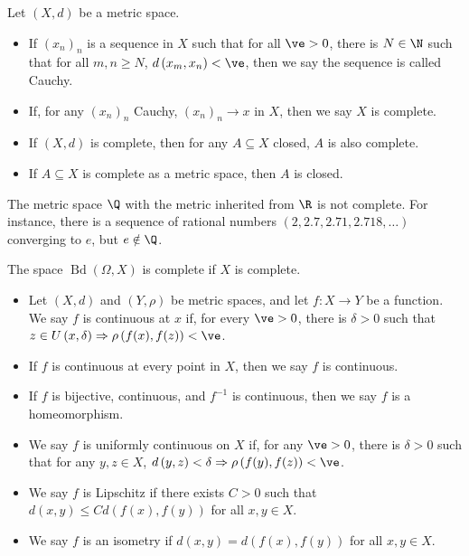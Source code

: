 \begin{definition}[Completeness]
  Let $\left(X,d\right)$ be a metric space.
  \begin{itemize}
    \item If $\left(x_n\right)_n$ is a sequence in $X$ such that for all $\ve > 0$, there is $N\in \N$ such that for all $m,n\geq N$, $d\left(x_m,x_n\right) < \ve$, then we say the sequence is called Cauchy.
    \item If, for any $\left(x_n\right)_n$ Cauchy, $\left(x_n\right)_n\rightarrow x$ in $X$, then we say $X$ is complete.
    \item If $\left(X,d\right)$ is complete, then for any $A\subseteq X$ closed, $A$ is also complete.
    \item If $A\subseteq X$ is complete as a metric space, then $A$ is closed.
  \end{itemize}
\end{definition}
\begin{example}
  The metric space $\Q$ with the metric inherited from $\R$ is not complete. For instance, there is a sequence of rational numbers $\left(2,2.7,2.71,2.718,\dots\right)$ converging to $e$, but $e\notin \Q$.\newline

  The space $\operatorname{Bd}\left(\Omega,X\right)$ is complete if $X$ is complete.
\end{example}
\begin{definition}[Continuity]\hfill
  \begin{itemize}
    \item Let $\left(X,d\right)$ and $\left(Y,\rho\right)$ be metric spaces, and let $f\colon X\rightarrow Y$ be a function. We say $f$ is continuous at $x$ if, for every $\ve > 0$, there is $\delta > 0$ such that $z\in U\left(x,\delta\right)\Rightarrow \rho\left(f(x),f(z)\right) < \ve$.
    \item If $f$ is continuous at every point in $X$, then we say $f$ is continuous.
    \item If $f$ is bijective, continuous, and $f^{-1}$ is continuous, then we say $f$ is a homeomorphism.
    \item We say $f$ is uniformly continuous on $X$ if, for any $\ve > 0$, there is $\delta > 0$ such that for any $y,z\in X$, $d\left(y,z\right) < \delta \Rightarrow \rho\left(f(y),f(z)\right) < \ve$.
    \item We say $f$ is Lipschitz if there exists $C > 0$ such that $d\left(x,y\right) \leq Cd\left(f(x),f(y)\right)$ for all $x,y\in X$.
    \item We say $f$ is an isometry if $d\left(x,y\right) = d\left(f(x),f(y)\right)$ for all $x,y\in X$.
  \end{itemize}
\end{definition}
